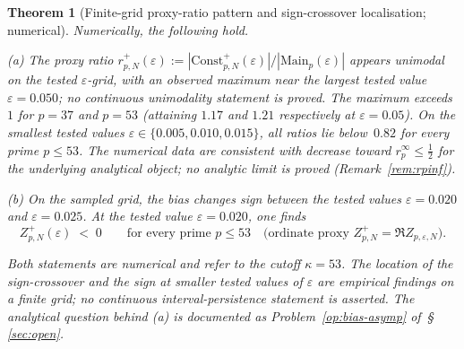 \documentclass[11pt]{article}
\newtheorem{theorem}{Theorem}[section]
\begin{document}
\begin{theorem}[Finite-grid proxy-ratio pattern and sign-crossover localisation; numerical]
\label{thm:ratio-signcross}
Numerically, the following hold.

\emph{(a)} The proxy ratio
$r^+_{p,N}(\varepsilon):=|\mathrm{Const}^+_{p,N}(\varepsilon)|/
|\mathrm{Main}_p(\varepsilon)|$ appears unimodal on the tested
$\varepsilon$-grid, with an observed maximum near the largest tested
value $\varepsilon=0.050$;
no continuous unimodality statement is proved.
The maximum exceeds~$1$ for $p=37$ and $p=53$
(attaining $1.17$ and $1.21$ respectively at $\varepsilon=0.05$).
On the smallest tested values $\varepsilon\in\{0.005,0.010,0.015\}$,
all ratios lie below~$0.82$ for every prime $p\le 53$.
The numerical data are consistent with decrease toward
$r_p^{\infty}\le\tfrac12$ for the underlying analytical object;
no analytic limit is proved
(Remark~\ref{rem:rpinf}).

\emph{(b)} On the sampled grid, the bias changes sign between
the tested values $\varepsilon=0.020$ and $\varepsilon=0.025$.
At the tested value $\varepsilon=0.020$, one finds
\[
Z_{p,N}^+(\varepsilon) \;<\; 0 \qquad
\text{for every prime } p\le 53
\quad\text{(ordinate proxy } Z_{p,N}^+ = \Re Z_{p,\varepsilon,N}\text{)}.
\]

Both statements are numerical and refer to the cutoff $\kappa=53$.
The location of the sign-crossover and the sign at smaller tested
values of $\varepsilon$ are empirical findings on a finite grid; no
continuous interval-persistence statement is asserted.
The analytical question behind (a) is documented as
Problem~\ref{op:bias-asymp} of~\S\,\ref{sec:open}.
\end{theorem}
\end{document}
